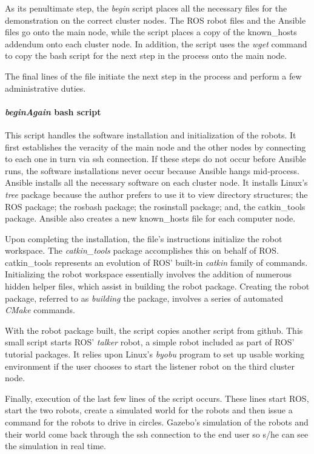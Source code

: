 \documentclass[9pt,twocolumn,twoside]{../../styles/osajnl}
\begin{document}
As its penultimate step, the \textit{begin} script places all the necessary files for the demonstration on the correct cluster nodes.  The ROS robot files and the Ansible files go onto the main node, while the script places a copy of the known\_hosts addendum onto each cluster node.  In addition, the script uses the \textit{wget} command to copy the bash script for the next step in the process onto the main node.

The final lines of the file initiate the next step in the process and perform a few administrative duties.

\paragraph{\textit{beginAgain} bash script}
This script handles the software installation and initialization of the robots.  It first establishes the veracity of the main node and the other nodes by connecting to each one in turn via ssh connection.  If these steps do not occur before Ansible runs, the software installations never occur because Ansible hangs mid-process.  Ansible installs all the necessary software on each cluster node.  It installs Linux's \textit{tree} package because the author prefers to use it to view directory structures; the ROS package; the rosbash package; the rosinstall package; and, the catkin\_tools package. Ansible also creates a new known\_hosts file for each computer node.

Upon completing the installation, the file's instructions initialize the robot workspace.  The \textit{catkin\_tools} package accomplishes this on behalf of ROS.  catkin\_tools represents an evolution of ROS' built-in \textit{catkin} family of commands.  Initializing the robot workspace essentially involves the addition of numerous hidden helper files, which assist in building the robot package.  Creating the robot package, referred to as \textit{building} the package, involves a series of automated \textit{CMake} commands.  

With the robot package built, the script copies another script from github.  This small script starts ROS' \textit{talker} robot, a simple robot included as part of ROS' tutorial packages.  It relies upon Linux's \textit{byobu} program to set up usable working environment if the user chooses to start the listener robot on the third cluster node.

Finally, execution of the last few lines of the script occurs.  These lines start ROS, start the two robots, create a simulated world for the robots and then issue a command for the robots to drive in circles.  Gazebo's simulation of the robots and their world come back through the ssh connection to the end user so s/he can see the simulation in real time. 
\end{document}
